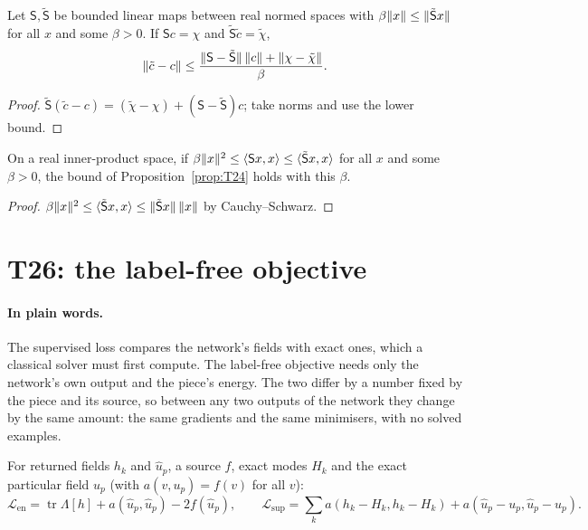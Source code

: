 \begin{proposition}[T24]\label{prop:T24}
  \leanok
  Let $\mathsf S,\tilde{\mathsf S}$ be bounded linear maps between real normed
  spaces with $\beta\lVert x\rVert\le\lVert \tilde{\mathsf S}x\rVert$ for all $x$ and some
  $\beta>0$.  If $\mathsf Sc=\chi$ and $\tilde{\mathsf S}\tilde c=\tilde\chi$,
  \[
    \lVert \tilde c-c\rVert\le
      \frac{\lVert \mathsf S-\tilde{\mathsf S}\rVert\,\lVert c\rVert+\lVert \chi-\tilde\chi\rVert}{\beta}.
  \]
\end{proposition}

\begin{proof}
  \leanok
  $\tilde{\mathsf S}(\tilde c-c)=(\tilde\chi-\chi)+(\mathsf S-\tilde{\mathsf S})c$;
  take norms and use the lower bound.
\end{proof}

\begin{corollary}\label{cor:T24-dominates}
  \leanok
  On a real inner-product space, if
  $\beta\lVert x\rVert^2\le\langle\mathsf Sx,x\rangle\le\langle\tilde{\mathsf S}x,x\rangle$
  for all $x$ and some $\beta>0$, the bound of Proposition~\ref{prop:T24} holds
  with this $\beta$.
\end{corollary}

\begin{proof}
  \leanok
  $\beta\lVert x\rVert^2\le\langle\tilde{\mathsf S}x,x\rangle
  \le\lVert \tilde{\mathsf S}x\rVert\,\lVert x\rVert$ by Cauchy--Schwarz.
\end{proof}

\section{T26: the label-free objective}

\paragraph{In plain words.}
The supervised loss compares the network's fields with exact ones, which a
classical solver must first compute.  The label-free objective needs only the
network's own output and the piece's energy.  The two differ by a number fixed
by the piece and its source, so between any two outputs of the network they
change by the same amount: the same gradients and the same minimisers, with no
solved examples.

\begin{definition}\label{def:objectives}
  \leanok
  For returned fields $h_k$ and $\hat u_p$, a source $f$, exact modes $H_k$ and
  the exact particular field $u_p$ (with $a(v,u_p)=f(v)$ for all $v$):
  \[
    \mathcal L_{\mathrm{en}}=\operatorname{tr}\Lambda[h]+a(\hat u_p,\hat u_p)-2f(\hat u_p),
    \qquad
    \mathcal L_{\mathrm{sup}}=\sum_ka(h_k-H_k,h_k-H_k)+a(\hat u_p-u_p,\hat u_p-u_p).
  \]
\end{definition}


